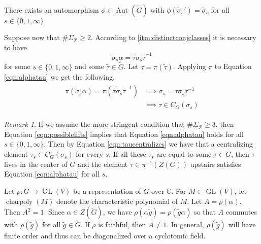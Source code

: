\documentclass{dcthesis}
\newcommand{\CC}{\mathbb C}
\newcommand{\wt}[1]{\widetilde{#1}}
\DeclareMathOperator{\Aut}{Aut}
\DeclareMathOperator{\GL}{GL}
\DeclareMathOperator{\charpoly}{charpoly}
\numberwithin{equation}{section}
\theoremstyle{definition}
\theoremstyle{remark}
\newtheorem{remark}[equation]{Remark}
\begin{document}
{{\begin{enumerate}
        There exists an automorphism
        $\phi\in\Aut(\wt{G})$
        with
        $\phi(\wt{\sigma}_s') = \wt{\sigma}_s$
        for all $s\in \{0,1,\infty\}$
    \end{enumerate}
    Suppose now that $\#\Sigma_\mathscr{P}\geq 2$.
    According to
    \ref{itm:distinctconjclasses}
    it is necessary to have
    \begin{equation}
      \label{eqn:alphatau}
      \wt{\sigma}_s\alpha
      =
      \wt{\tau}\wt{\sigma}_s\wt{\tau}^{-1}
    \end{equation}
    for some $s\in \{0,1,\infty\}$
    and some $\wt{\tau}\in\wt{G}$.
    Let $\tau = \pi(\wt{\tau})$.
    Applying $\pi$ to Equation
    \ref{eqn:alphatau}
    we get the following.
    \begin{align}
      \label{eqn:taucentralizes}
      \begin{split}
        \pi(\wt{\sigma}_s\alpha)=
        \pi(\wt{\tau}\wt{\sigma}_s\wt{\tau}^{-1})
        &\implies
        \sigma_s = \tau\sigma_s\tau^{-1}\\
        &\implies
        \tau\in C_G(\sigma_s)
      \end{split}
    \end{align}
    \begin{remark}
      \label{rmk:size3}
      If we assume the more stringent condition
      that $\#\Sigma_\mathscr{P}\geq 3$,
      then Equation
      \ref{eqn:possiblelifts}
      implies that
      Equation \ref{eqn:alphatau}
      holds for all $s\in \{0,1,\infty\}$.
      Then by
      Equation
      \ref{eqn:taucentralizes}
      we have that a centralizing element
      $\tau_s\in C_G(\sigma_s)$ for every $s$.
      If all these $\tau_s$ are equal to some
      $\tau\in G$, then $\tau$ lives in the
      center of $G$
      and the element
      $\wt{\tau}\in\pi^{-1}(Z(G))$
      upstairs
      satisfies
      Equation
      \ref{eqn:alphatau}
      for all $s$.
    \end{remark}
    Let $\rho\colon \wt{G}\to\GL(V)$ be a
    representation
    of $\wt{G}$ over $\CC$.
    For $M\in\GL(V)$, let
    $\charpoly(M)$ denote the
    characteristic polynomial of $M$.
    Let $A = \rho(\alpha)$.
    Then $A^2=1$.
    Since $\alpha\in Z(\wt{G})$,
    we have
    $\rho(\alpha \wt{g}) = \rho(\wt{g}\alpha)$
    so that $A$ commutes with $\rho(\wt{g})$
    for all $\wt{g}\in \wt{G}$.
    If $\rho$ is faithful,
    then $A\neq 1$.
    In general,
    $\rho(\wt{g})$ will have finite order
    and thus can be diagonalized
    over a cyclotomic field.
}}
\end{document}
